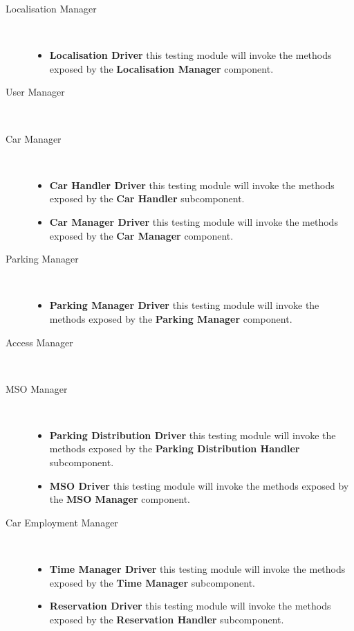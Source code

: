 		\begin{description}
		\item[Localisation Manager]~\\
			\begin{itemize}
				\item \textbf{Localisation Driver} this testing module will invoke the methods exposed by the \textbf{Localisation Manager} component.
			\end{itemize}
		\item[User Manager]~\\ %
		\item[Car Manager]~\\
			\begin{itemize}
				\item \textbf{Car Handler Driver} this testing module will invoke the methods exposed by the \textbf{Car Handler} subcomponent.
				\item \textbf{Car Manager Driver} this testing module will invoke the methods exposed by the \textbf{Car Manager} component.
			\end{itemize}
		\item[Parking Manager]~\\
			\begin{itemize}
				\item \textbf{Parking Manager Driver} this testing module will invoke the methods exposed by the \textbf{Parking Manager} component.
			\end{itemize}
		\item[Access Manager]~\\ %
		\item[MSO Manager]~\\
			\begin{itemize}
				\item \textbf{Parking Distribution Driver} this testing module will invoke the methods exposed by the \textbf{Parking Distribution Handler} subcomponent.
				\item \textbf{MSO Driver} this testing module will invoke the methods exposed by the \textbf{MSO Manager} component.
			\end{itemize}
		\item[Car Employment Manager]~\\
			\begin{itemize}
				\item \textbf{Time Manager Driver} this testing module will invoke the methods exposed by the \textbf{Time Manager} subcomponent.
				\item \textbf{Reservation Driver} this testing module will invoke the methods exposed by the \textbf{Reservation Handler} subcomponent.

\end{itemize}
\end{description}
